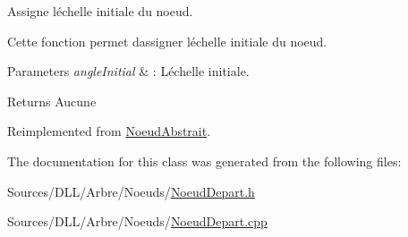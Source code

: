 Assigne l\textquotesingle{}échelle initiale du noeud. 

Cette fonction permet d\textquotesingle{}assigner l\textquotesingle{}échelle initiale du noeud.


\begin{DoxyParams}{Parameters}
{\em angle\+Initial} & \+: L\textquotesingle{}échelle initiale.\\
\hline
\end{DoxyParams}
\begin{DoxyReturn}{Returns}
Aucune 
\end{DoxyReturn}


Reimplemented from \hyperlink{group__inf2990_gae51f2e4da1ff9308a55324d4aafd72db}{Noeud\+Abstrait}.



The documentation for this class was generated from the following files\+:\begin{DoxyCompactItemize}
\item 
Sources/\+D\+L\+L/\+Arbre/\+Noeuds/\hyperlink{_noeud_depart_8h}{Noeud\+Depart.\+h}\item 
Sources/\+D\+L\+L/\+Arbre/\+Noeuds/\hyperlink{_noeud_depart_8cpp}{Noeud\+Depart.\+cpp}\end{DoxyCompactItemize}
